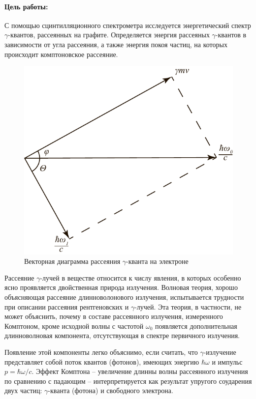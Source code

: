 \documentclass[a4paper,12pt]{article}
\begin{document}
\paragraph{Цель работы:}
С помощью сцинтилляционного спектрометра исследуется энергетический спектр $\gamma$-квантов, рассеянных на графите. Определяется энергия рассеяных $\gamma$-квантов в зависимости от угла рассеяния, а также энергия покоя частиц, на которых происходит комптоновское рассеяние.\par
\begin{figure}
	\begin{center}
		\includegraphics[width=\linewidth]{pic1.pdf}
		\caption{Векторная диаграмма рассеяния $\gamma$-кванта на электроне}
		\label{pic1}
	\end{center}
\end{figure}
Рассеяние $\gamma$-лучей в веществе относится к числу явления, в которых особенно ясно проявляется двойственная природа излучения. Волновая теория, хорошо объясняющая рассеяние длинноволонового излучения, испытывается трудности при описании рассеяния рентгеновских и $\gamma$-лучей. Эта теория, в частности, не может объяснить, почему в составе рассеянного излучения, измеренного Комптоном, кроме исходной волны с частотой $\omega_0$ появляется дополнительная длинноволновая компонента, отсутствующая в спектре первичного излучения.\par
Появление этой компоненты легко объяснимо, если считать, что $\gamma$-излучение представляет собой поток квантов (фотонов), имеющих энергию $\hbar\omega$ и импульс $p=\hbar\omega/c$. Эффект Комптона -- увеличение длинны волны рассеянного излучения по сравнению с падающим -- интерпретируется как результат упругого соударения двух частиц: $\gamma$-кванта (фотона) и свободного электрона.\par
\end{document}

